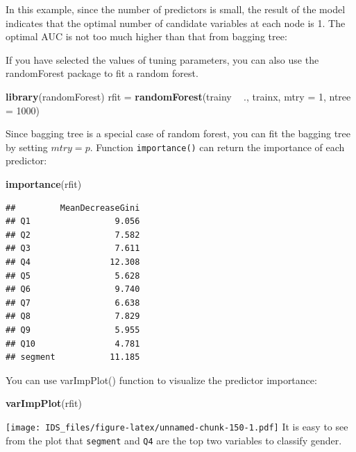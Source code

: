 \documentclass[12pt,]{krantz}
\makeatletter
\newenvironment{Shaded}{\begin{snugshade}}{\end{snugshade}}
\newcommand{\DataTypeTok}[1]{\textcolor[rgb]{0.27,0.27,0.27}{#1}}
\newcommand{\DecValTok}[1]{\textcolor[rgb]{0.06,0.06,0.06}{#1}}
\newcommand{\KeywordTok}[1]{\textcolor[rgb]{0.27,0.27,0.27}{\textbf{#1}}}
\newcommand{\NormalTok}[1]{#1}
\newcommand{\OperatorTok}[1]{\textcolor[rgb]{0.43,0.43,0.43}{\textbf{#1}}}
\newcommand{\StringTok}[1]{\textcolor[rgb]{0.5,0.5,0.5}{#1}}
\newenvironment{kframe}{%
\medskip{}
\setlength{\fboxsep}{.8em}
 \def\at@end@of@kframe{}%
 \ifinner\ifhmode%
  \def\at@end@of@kframe{\end{minipage}}%
  \begin{minipage}{\columnwidth}%
 \fi\fi%
 \def\FrameCommand##1{\hskip\@totalleftmargin \hskip-\fboxsep
 \colorbox{shadecolor}{##1}\hskip-\fboxsep
     \hskip-\linewidth \hskip-\@totalleftmargin \hskip\columnwidth}%
 \MakeFramed {\advance\hsize-\width
   \@totalleftmargin\z@ \linewidth\hsize
   \@setminipage}}%
 {\par\unskip\endMakeFramed%
 \at@end@of@kframe}
\renewenvironment{Shaded}{\begin{kframe}}{\end{kframe}}
\makeatother
\begin{document}
In this example, since the number of predictors is small, the result of the model indicates that the optimal number of candidate variables at each node is 1. The optimal AUC is not too much higher than that from bagging tree:

If you have selected the values of tuning parameters, you can also use the randomForest package to fit a random forest.

\begin{Shaded}
\begin{Highlighting}[]
\KeywordTok{library}\NormalTok{(randomForest)}
\NormalTok{rfit =}\StringTok{ }\KeywordTok{randomForest}\NormalTok{(trainy }\OperatorTok{~}\StringTok{ }\NormalTok{., trainx, }\DataTypeTok{mtry =} \DecValTok{1}\NormalTok{, }\DataTypeTok{ntree =} \DecValTok{1000}\NormalTok{)}
\end{Highlighting}
\end{Shaded}

Since bagging tree is a special case of random forest, you can fit the bagging tree by setting \(mtry=p\). Function \texttt{importance()} can return the importance of each predictor:

\begin{Shaded}
\begin{Highlighting}[]
\KeywordTok{importance}\NormalTok{(rfit)}
\end{Highlighting}
\end{Shaded}

\begin{verbatim}
##         MeanDecreaseGini
## Q1                 9.056
## Q2                 7.582
## Q3                 7.611
## Q4                12.308
## Q5                 5.628
## Q6                 9.740
## Q7                 6.638
## Q8                 7.829
## Q9                 5.955
## Q10                4.781
## segment           11.185
\end{verbatim}

You can use varImpPlot() function to visualize the predictor importance:

\begin{Shaded}
\begin{Highlighting}[]
\KeywordTok{varImpPlot}\NormalTok{(rfit)}
\end{Highlighting}
\end{Shaded}

\texttt{[image: IDS\_files/figure-latex/unnamed-chunk-150-1.pdf]}
It is easy to see from the plot that \texttt{segment} and \texttt{Q4} are the top two variables to classify gender.
\end{document}
